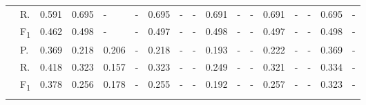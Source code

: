 \begin{tabularx}{\textwidth}{p{1.3em}l Z  Z  Z  Z  Z  Z  Z  Z  Z  Z  Z  Z  Z  Z  Z }
                & R.                     & 0.591     & 0.695     & -     & -     & 0.695     & -     & -     & 0.691     & -     & -     & 0.691     & -     & -     & 0.695     & -     \\
                & F\textsubscript{1}     & 0.462         & 0.498         & -         & -         & 0.497         & -         & -         & 0.498         & -         & -         & 0.497         & -         & -         & 0.498         & -         \\
                     \midrule     {}
                & P.                     & 0.369  & 0.218  & 0.206  & -  & 0.218  & -  & -  & 0.193  & -  & -  & 0.222  & -  & -  & 0.369  & -  \\
                & R.                     & 0.418     & 0.323     & 0.157     & -     & 0.323     & -     & -     & 0.249     & -     & -     & 0.321     & -     & -     & 0.334     & -     \\
                & F\textsubscript{1}     & 0.378         & 0.256         & 0.178         & -         & 0.255         & -         & -         & 0.192         & -         & -         & 0.257         & -         & -         & 0.323         & -         \\
                     \midrule     {}
\end{tabularx}